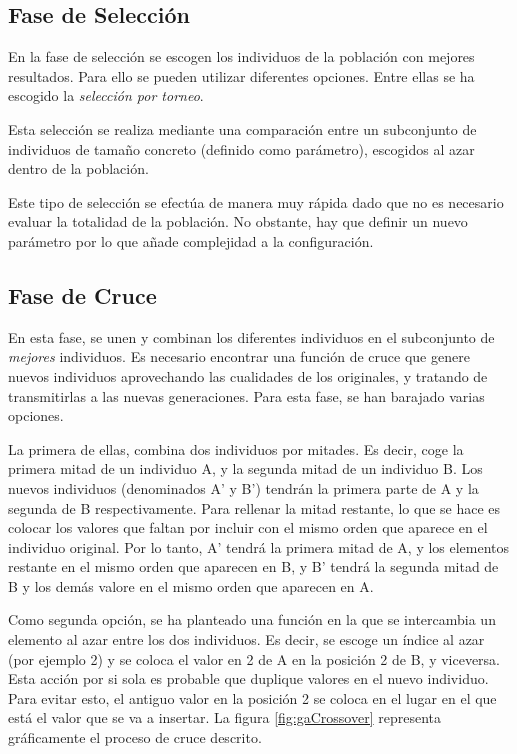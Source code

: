 \documentclass[10pt,a4paper]{article}
\begin{document}
\subsection{Fase de Selección}
En la fase de selección se escogen los individuos de la población con mejores resultados. 
Para ello se pueden utilizar diferentes opciones. Entre ellas se ha escogido la \textit{selección por torneo}. 

Esta selección se realiza mediante una comparación entre un subconjunto de individuos de tamaño concreto (definido como parámetro), escogidos al azar dentro de la población.

Este tipo de selección se efectúa de manera muy rápida dado que no es necesario evaluar la totalidad de la población. No obstante, hay que definir un nuevo parámetro por lo que añade complejidad a la configuración.

\subsection{Fase de Cruce}
En esta fase, se unen y combinan los diferentes individuos en el subconjunto de \textit{mejores} individuos. Es necesario encontrar una función de cruce que genere nuevos individuos aprovechando las cualidades de los originales, y tratando de transmitirlas a las nuevas generaciones. Para esta fase, se han barajado varias opciones. 

La primera de ellas, combina dos individuos por mitades. Es decir, coge la primera mitad de un individuo A, y la segunda mitad de un individuo B. Los nuevos individuos (denominados A' y B') tendrán la primera parte de A y la segunda de B respectivamente. Para rellenar la mitad restante, lo que se hace es colocar los valores que faltan por incluir con el mismo orden que aparece en el individuo original. Por lo tanto, A' tendrá la primera mitad de A, y los elementos restante en el mismo orden que aparecen en B, y B' tendrá la segunda mitad de B y los demás valore en el mismo orden que aparecen en A.

Como segunda opción, se ha planteado una función en la que se intercambia un elemento al azar entre los dos individuos. Es decir, se escoge un índice al azar (por ejemplo 2) y se coloca el valor en 2 de A en la posición 2 de B, y viceversa. Esta acción por si sola es probable que duplique valores en el nuevo individuo. Para evitar esto, el antiguo valor en la posición 2 se coloca en el lugar en el que está el valor que se va a insertar. La figura \ref{fig:gaCrossover} representa gráficamente el proceso de cruce descrito.
\end{document}

